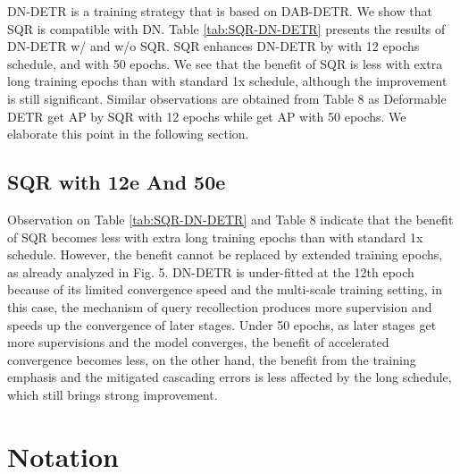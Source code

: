 \documentclass[10pt,twocolumn,letterpaper]{article}
\begin{document}
DN-DETR \cite{Li2022DNDETRAD} is a training strategy that is based on DAB-DETR. We show that SQR is compatible with DN. Table \ref{tab:SQR-DN-DETR} presents the results of DN-DETR w/ and w/o SQR. SQR enhances DN-DETR by  with 12 epochs schedule, and  with 50 epochs. We see that the benefit of SQR is less with extra long training epochs than with standard 1x schedule, although the improvement is still significant. Similar observations are obtained from Table {\color{red} 8} as Deformable DETR get  AP by SQR with 12 epochs while get  AP with 50 epochs. We elaborate this point in the following section.

\subsection{SQR with 12e And 50e}

Observation on Table \ref{tab:SQR-DN-DETR} and Table {\color{red} 8} indicate that the benefit of SQR becomes less with extra long training epochs than with standard 1x schedule. However, the benefit cannot be replaced by extended training epochs, as already analyzed in Fig.{\color{red} 5}. DN-DETR is under-fitted at the 12th epoch because of its limited convergence speed and the multi-scale training setting, in this case, the mechanism of query recollection produces more supervision and speeds up the convergence of later stages. Under 50 epochs, as later stages get more supervisions and the model converges, the benefit of accelerated convergence becomes less, on the other hand, the benefit from the training emphasis and the mitigated cascading errors is less affected by the long schedule, which still brings strong improvement. 



\section{Notation}
\end{document}
